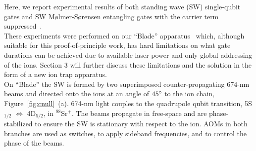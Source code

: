 \documentclass[12pt]{iopart}
\begin{document}
    Here, we report experimental results of both standing wave (SW)
    single-qubit gates and SW M\o lmer-S\o rensen
    entangling gates with the carrier term suppressed~\cite{saner_breaking_2023}.\\
    These experiments were performed on our ``Blade'' apparatus~\cite{shafer_fast_2020, thirumalai_high_2019} which,
    although suitable for this proof-of-principle work, has hard
    limitations on what gate durations can be achieved due to
    available laser power and only global addressing of the ions.
    Section 3 will further discuss these limitations and the solution
    in the form of a new ion trap apparatus.\\

    On ``Blade'' the SW is formed by two superimposed
    counter-propagating 674-nm beams and directed onto the ions at an
    angle of $45\degree$ to the ion chain,
    Figure~\ref{fig:cnull}~(a). 674-nm light couples to the quadrupole
    qubit transition, 5S$_{1/2}$ $\Leftrightarrow$ 4D$_{5/2}$, in
    $^{88}$Sr$^+$.  The beams propagate in free-space and are
    phase-stabilized to ensure the SW is stationary with respect to
    the ion. AOMs in both branches are used as switches, to apply
    sideband frequencies, and to control the phase of the beams.\\



\end{document}
